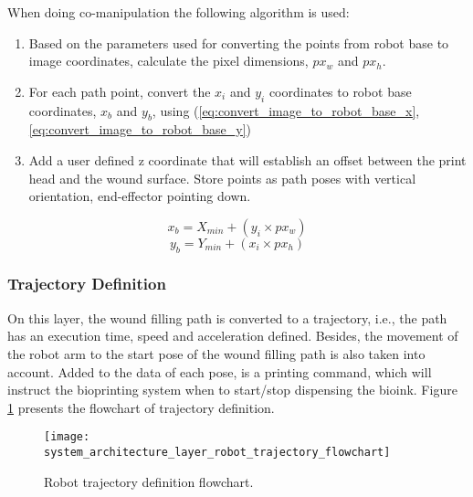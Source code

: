 When doing co-manipulation the following algorithm is used:

\begin{enumerate}
    \item Based on the parameters used for converting the points from robot base to image coordinates, calculate the pixel dimensions, $px_w$ and $px_h$.
    \item For each path point, convert the $x_i$ and $y_i$ coordinates to robot base coordinates, $x_b$ and $y_b$, using (\ref{eq:convert_image_to_robot_base_x}, \ref{eq:convert_image_to_robot_base_y})
    \item Add a user defined z coordinate that will establish an offset between the print head and the wound surface. Store points as path poses with vertical orientation, end-effector pointing down.
\end{enumerate}

\begin{equation}
\label{eq:convert_image_to_robot_base_x}
    x_b = X_{min} + (y_i \times px_w)
\end{equation}
\begin{equation}
\label{eq:convert_image_to_robot_base_y}
    y_b = Y_{min} + (x_i \times px_h)
\end{equation}


\subsubsection*{Trajectory Definition}
\label{subsubsec:system_architectural_robot_layers_trajectory_definition}

On this layer, the wound filling path is converted to a trajectory, i.e., the path has an execution time, speed and acceleration defined. Besides, the movement of the robot arm to the start pose of the wound filling path is also taken into account. Added to the data of each pose, is a printing command, which will instruct the bioprinting system when to start/stop dispensing the bioink. Figure \ref{fig:system_architecture_layer_robot_trajectory_flowchart} presents the flowchart of trajectory definition.

\begin{figure}[htbp]
	\centering
	\texttt{[image: system\_architecture\_layer\_robot\_trajectory\_flowchart]}
	\caption{Robot trajectory definition flowchart.}
	\label{fig:system_architecture_layer_robot_trajectory_flowchart}
\end{figure}


